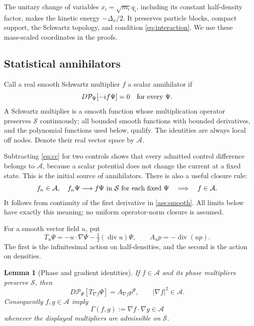 \documentclass[11pt]{article}
\numberwithin{equation}{section}
\newtheorem{lemma}[lemma]{Lemma}
\theoremstyle{definition}
\newcommand{\Sch}{\mathcal S}
\newcommand{\Pcal}{\mathcal P}
\newcommand{\Acal}{\mathcal A}
\newcommand{\diver}{\operatorname{div}}
\begin{document}
The unitary change of variables \(x_i=\sqrt{m_i}q_i\), including its constant half-density factor, makes the kinetic energy \(-\Delta_x/2\). It preserves particle blocks, compact support, the Schwartz topology, and condition \eqref{eq:interaction}. We use these mass-scaled coordinates in the proofs.

\subsection{Statistical annihilators}

Call a real smooth Schwartz multiplier \(f\) a scalar annihilator if
\begin{equation}\label{eq:ann}
 D\Pcal_\Psi[-if\Psi]=0\quad\hbox{for every }\Psi.
\end{equation}
A Schwartz multiplier is a smooth function whose multiplication operator preserves \(\Sch\) continuously; all bounded smooth functions with bounded derivatives, and the polynomial functions used below, qualify. The identities are always local off nodes. Denote their real vector space by \(\Acal\).

Subtracting \eqref{eq:cc} for two controls shows that every admitted control difference belongs to \(\Acal\), because a scalar potential does not change the current at a fixed state. This is the initial source of annihilators. There is also a useful closure rule:
\begin{equation}\label{eq:closure}
 f_n\in\Acal,\quad f_n\Psi\longrightarrow f\Psi\ \hbox{in }\Sch
 \ \hbox{for each fixed }\Psi
 \quad\Longrightarrow\quad f\in\Acal.
\end{equation}
It follows from continuity of the first derivative in \ref{ass:smooth}. All limits below have exactly this meaning; no uniform operator-norm closure is assumed.

For a smooth vector field \(u\), put
\begin{equation}\label{eq:transportoperators}
 T_u\Psi=-u\cdot\nabla\Psi-\tfrac12(\diver u)\Psi,
 \qquad A_u p=-\diver(up).
\end{equation}
The first is the infinitesimal action on half-densities, and the second is the action on densities.

\begin{lemma}[Phase and gradient identities]\label{lem:phase}
If \(f\in\Acal\) and its phase multipliers preserve \(\Sch\), then
\begin{equation}\label{eq:grad}
 D\Pcal_\Psi[T_{\nabla f}\Psi]=A_{\nabla f}p^\Psi,
 \qquad |\nabla f|^2\in\Acal.
\end{equation}
Consequently \(f,g\in\Acal\) imply
\begin{equation}\label{eq:gamma}
 \Gamma(f,g):=\nabla f\cdot\nabla g\in\Acal
\end{equation}
whenever the displayed multipliers are admissible on \(\Sch\).
\end{lemma}
\end{document}
